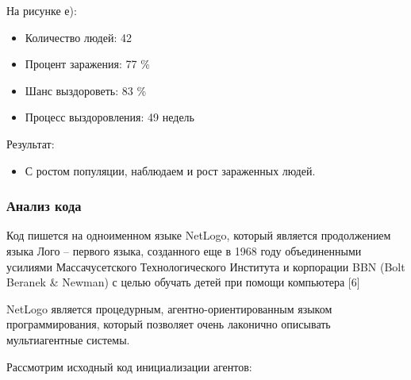 \documentclass[14pt,a4paper,report]{report}
\begin{document}
На рисунке е):
\begin{itemize}
\item Количество людей: 42
\item Процент заражения: 77 \%
\item Шанс выздороветь: 83 \%
\item Процесс выздоровления: 49 недель
\end{itemize}
Результат:
\begin{itemize}
\item  С ростом популяции, наблюдаем и рост зараженных людей.
\end{itemize}
\clearpage

\subsubsection{Анализ кода}

Код пишется на одноименном языке NetLogo, который является продолжением языка Лого -- первого языка, созданного еще в 1968 году объединенными усилиями Массачусетского Технологического Института и корпорации BBN (Bolt Beranek \& Newman) с целью обучать детей при помощи компьютера [6]

NetLogo является процедурным, агентно-ориентированным языком программирования, который позволяет очень лаконично описывать мультиагентные системы.

Рассмотрим исходный код инициализации агентов:
\end{document}
